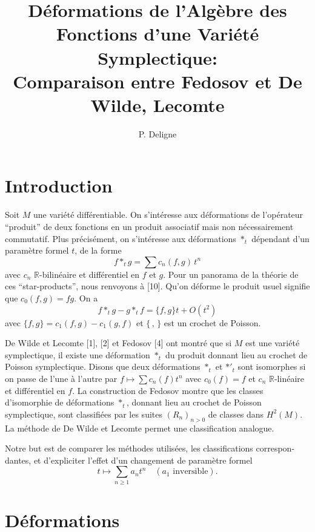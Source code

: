 \documentclass[11pt,a4paper]{article}
\theoremstyle{plain}
\theoremstyle{definition}
\newcommand{\R}{\mathbb{R}}
\begin{document}
\title{D\'eformations de l'Alg\`ebre des Fonctions d'une Vari\'et\'e Symplectique: \\
Comparaison entre Fedosov et De Wilde, Lecomte}
\author{P. Deligne}
\date{}
\maketitle

\section*{Introduction}

Soit $M$ une vari\'et\'e diff\'erentiable. On s'int\'eresse aux d\'eformations de l'op\'erateur
``produit'' de deux fonctions en un produit associatif mais non n\'ecessairement
commutatif. Plus pr\'ecis\'ement, on s'int\'eresse aux d\'eformations $*_{t}$ d\'ependant d'un
param\`etre formel $t$, de la forme
\[
f *_{t} g = \sum c_{n}(f,g)\, t^{n}
\]
avec $c_{n}$ $\R$-bilin\'eaire et diff\'erentiel en $f$ et $g$. Pour un panorama de la th\'eorie de ces
``star-products'', nous renvoyons \`a [10]. Qu'on d\'eforme le produit usuel signifie que
$c_{0}(f, g) = fg$. On a
\[
f *_{t} g - g *_{t} f = \{f,g\}t + O(t^{2})
\]
avec $\{f, g\} = c_{1}(f, g) - c_{1}(g, f)$ et $\{\, , \,\}$ est un crochet de Poisson.

De Wilde et Lecomte [1], [2] et Fedosov [4] ont montr\'e que si $M$ est une vari\'et\'e
symplectique, il existe une d\'eformation $*_{t}$ du produit donnant lieu au crochet de
Poisson symplectique. Disons que deux d\'eformations $*_{t}$ et $*'_{t}$ sont isomorphes si
on passe de l'une \`a l'autre par $f \mapsto \sum c_{n}(f)t^{n}$ avec $c_{0}(f) = f$ et $c_{n}$ $\R$-lin\'eaire et
diff\'erentiel en $f$. La construction de Fedosov montre que les classes d'isomorphie de
d\'eformations $*_{t}$, donnant lieu au crochet de Poisson symplectique, sont classifi\'ees
par les suites $(R_{n})_{n > 0}$ de classes dans $H^{2}(M)$. La m\'ethode de De Wilde et Lecomte
permet une classification analogue.

Notre but est de comparer les m\'ethodes utilis\'ees, les classifications correspon-
dantes, et d'expliciter l'effet d'un changement de param\`etre formel
\[
t \mapsto \sum_{n \geq 1} a_{n} t^{n} \quad (a_{1} \text{ inversible}).
\]


\section{D\'eformations}
\end{document}
